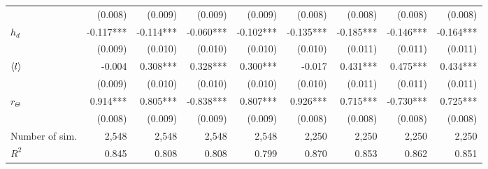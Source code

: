 \begin{table}
{\begin{tabular}{lrrrrrrrr}
                   &                   (0.008) &                  (0.009) &                  (0.009) &                  (0.009)   &   (0.008) &                  (0.008) &                  (0.008) &                  (0.008)\\ 
    $h_d$          &                 -0.117*** &                -0.114*** &                -0.060*** &                -0.102***   & -0.135*** &                -0.185*** &                -0.146*** &                -0.164***\\ 
                   &                   (0.009) &                  (0.010) &                  (0.010) &                  (0.010)   &   (0.010) &                  (0.011) &                  (0.011) &                  (0.011)\\ 
    $\langle l \rangle$           &                    -0.004 &                 0.308*** &                 0.328*** &                 0.300***   &    -0.017 &                 0.431*** &                 0.475*** &                 0.434***\\ 
                   &                   (0.009) &                  (0.010) &                  (0.010) &                  (0.010)   &   (0.010) &                  (0.011) &                  (0.011) &                  (0.011)\\ 
    $r_\Theta$     &                  0.914*** &                 0.805*** &                -0.838*** &                 0.807***   &  0.926*** &                 0.715*** &                -0.730*** &                 0.725***\\ 
                   &                   (0.008) &                  (0.009) &                  (0.009) &                  (0.009)   &   (0.008) &                  (0.008) &                  (0.008) &                  (0.008)\\ 
    \midrule
    Number of sim. &                     2,548 &                    2,548 &                    2,548 &                    2,548   &     2,250 &                    2,250 &                    2,250 &                    2,250\\ 
    $R^2$          &                     0.845 &                    0.808 &                    0.808 &                    0.799   &     0.870 &                    0.853 &                    0.862 &                    0.851\\ 
    \bottomrule
    \end{tabular}
    }
    \label{tableSI:coefficients_set2}
\end{table}
\FloatBarrier

